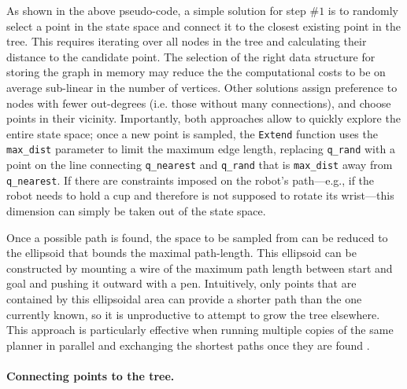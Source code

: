 As shown in the above pseudo-code, a simple solution for step $\#1$ is to randomly select a point in the state space and connect it to the closest existing point in the tree. This requires iterating over all nodes in the tree and calculating their distance to the candidate point.
The selection of the right data structure for storing the graph in memory may reduce the the computational costs to be on average sub-linear in the number of vertices. Other solutions assign preference to nodes with fewer out-degrees (i.e. those without many connections), and choose points in their vicinity.
Importantly, both approaches allow to quickly explore the entire state space; once a new point is sampled, the \texttt{Extend} function uses the \texttt{max\_dist} parameter to limit the maximum edge length, replacing \texttt{q\_rand} with a point on the line connecting \texttt{q\_nearest} and \texttt{q\_rand} that is \texttt{max\_dist} away from \texttt{q\_nearest}.
%
If there are constraints imposed on the robot's path---e.g., if the robot needs to hold a cup and therefore is not supposed to rotate its wrist---this dimension can simply be taken out of the state space.

Once a possible path is found, the space to be sampled from can be reduced to the ellipsoid that bounds the maximal path-length. This ellipsoid can be constructed by mounting a wire of the maximum path length between start and goal and pushing it outward with a pen. Intuitively, only points that are contained by this ellipsoidal area can provide a shorter path than the one currently known, so it is unproductive to attempt to grow the tree elsewhere. This approach is particularly effective when running multiple copies of the same planner in parallel and exchanging the shortest paths once they are found \cite{otte2012}.

\paragraph{Connecting points to the tree.}


